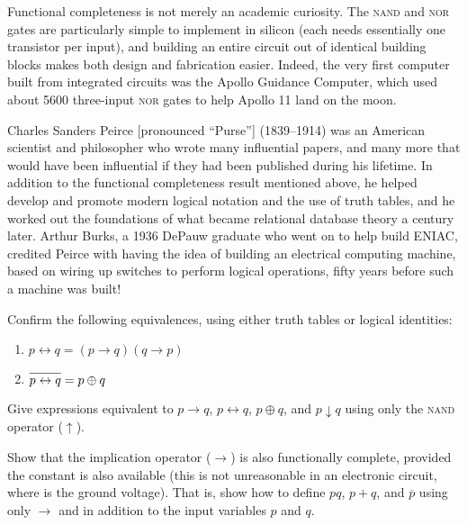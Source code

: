 Functional completeness is not merely an academic curiosity. The \textsc{nand} and \textsc{nor} gates are particularly simple to implement in silicon (each needs essentially one transistor per input), and building an entire circuit out of identical building blocks makes both design and fabrication easier. Indeed, the very first computer built from integrated circuits was the Apollo Guidance Computer, which used about 5600 three-input \textsc{nor} gates to help Apollo 11 land on the moon.

\begin{tailquote}
Charles Sanders Peirce [pronounced ``Purse''] (1839--1914) was an American scientist and philosopher who wrote many influential papers, and many more that would have been influential if they had been published during his lifetime. In addition to the functional completeness result mentioned above, he helped develop and promote modern logical notation and the use of truth tables, and he worked out the foundations of what became relational database theory a century later. Arthur Burks, a 1936 DePauw graduate who went on to help build ENIAC, credited Peirce with having the idea of building an electrical computing machine, based on wiring up switches to perform logical operations, fifty years before such a machine was built!
\end{tailquote}

\begin{exercises}
\problem Confirm the following equivalences, using either truth tables or logical identities:
\begin{enumerate}
\item $p\leftrightarrow q = (p\rightarrow q)(q\rightarrow p)$
\item $\overline{p\leftrightarrow q\vphantom{X}} = p\oplus q$
\end{enumerate}

\problem Give expressions equivalent to $p\rightarrow q$, $p\leftrightarrow q$, $p\oplus q$, and $p\downarrow q$ using only the \textsc{nand} operator ($\uparrow$).

\problem Show that the implication operator ($\rightarrow$) is also functionally complete, provided the constant \0 is also available (this is not unreasonable in an electronic circuit, where \0 is the ground voltage). That is, show how to define $pq$, $p+q$, and $\overline{p}$ using only $\rightarrow$ and \0 in addition to the input variables $p$ and $q$.
\end{exercises}
